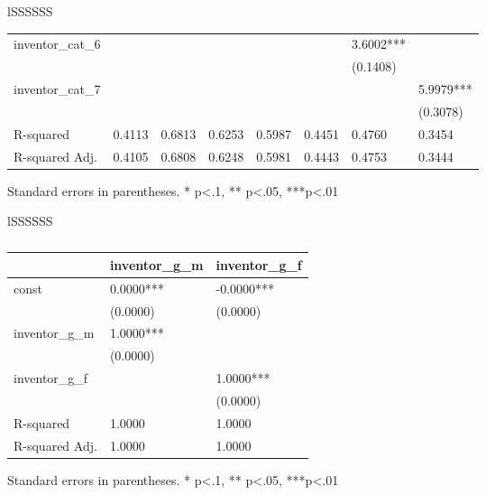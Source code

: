 \documentclass{article}
\begin{document}
\begin{table}[h]
\begin{tabular}{lSSSSSS}
\begin{table}
\begin{center}
\begin{tabular}{llllllll}
inventor\_cat\_6 &            &             &              &               &                & 3.6002***       &                   \\
                 &            &             &              &               &                & (0.1408)        &                   \\
inventor\_cat\_7 &            &             &              &               &                &                 & 5.9979***         \\
                 &            &             &              &               &                &                 & (0.3078)          \\
R-squared        & 0.4113     & 0.6813      & 0.6253       & 0.5987        & 0.4451         & 0.4760          & 0.3454            \\
R-squared Adj.   & 0.4105     & 0.6808      & 0.6248       & 0.5981        & 0.4443         & 0.4753          & 0.3444            \\
\hline
\end{tabular}
\end{center}
\end{table}
\bigskip
Standard errors in parentheses. \newline 
* p<.1, ** p<.05, ***p<.01\bottomrule
\end{tabular}
\end{table}

\begin{table}[h]
\centering
\caption{Statistical tests for childhood exposure to innovation by gender}
\begin{tabular}{lSSSSSS}
\toprule
\begin{table}
\caption{}
\label{}
\begin{center}
\begin{tabular}{lll}
\hline
               & inventor\_g\_m & inventor\_g\_f  \\
\hline
const          & 0.0000***      & -0.0000***      \\
               & (0.0000)       & (0.0000)        \\
inventor\_g\_m & 1.0000***      &                 \\
               & (0.0000)       &                 \\
inventor\_g\_f &                & 1.0000***       \\
               &                & (0.0000)        \\
R-squared      & 1.0000         & 1.0000          \\
R-squared Adj. & 1.0000         & 1.0000          \\
\hline
\end{tabular}
\end{center}
\end{table}
\bigskip
Standard errors in parentheses. \newline 
* p<.1, ** p<.05, ***p<.01\bottomrule
\end{tabular}
\end{table}
\end{document}
